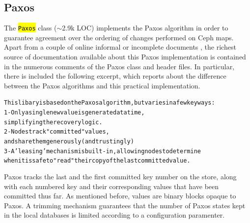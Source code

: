 \documentclass{article}
\newcommand{\hlc}[2][yellow]{\sethlcolor{#1}\hl{#2}}
\renewcommand{\c}[1]{\xspace{\small\hlc[light-gray]{\texttt{#1}}}\xspace}
\begin{document}
\subsection{Paxos}
The \c{Paxos} class ($\sim$2.9k LOC) implements the Paxos algorithm in order 
to guarantee agreement over the ordering of changes performed on Ceph maps.
Apart from a couple of online informal or incomplete documents \cite{ceph-paxos1,ceph-paxos2}, 
the richest source of documentation available about this Paxos implementation is contained
in the numerous comments of the Paxos class and header files.
In particular, there is included the following excerpt, which reports about the difference between the Paxos algorithms
and this practical implementation.

\begin{alltt}
\small
This libary is based on the Paxos algorithm, but varies in a few key ways:
 1- Only a single new value is generated at a time, 
    simplifying the recovery logic.
 2- Nodes track "committed" values, 
    and share them generously (and trustingly)
 3- A 'leasing' mechanism is built-in, allowing nodes to determine 
    when it is safe to "read" their copy of the last committed value.
\end{alltt}

Paxos tracks the last and the first committed key number on the store, along with each numbered key and their 
corresponding values that have been committed thus far.
As mentioned before, values are binary blocks opaque to Paxos.
A trimming mechanism guarantees that the number of Paxos states kept in the local databases is limited
according to a configuration paramenter.
\end{document}
